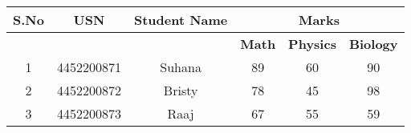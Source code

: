 \documentclass{article}
\begin{document}
\begin{tabular}{|c|c|c|c|c|c|}
\hline
\textbf{S.No} & \textbf{USN} & \textbf{Student Name} & \multicolumn{3}{c|}{\textbf{Marks}} \\ \hline
              &              &                       & \textbf{Math} & \textbf{Physics} & \textbf{Biology} \\ \hline
1             & 4452200871   & Suhana                & 89                & 60                & 90                \\ \hline
2             & 4452200872   & Bristy                & 78                & 45                & 98                \\ \hline
3             & 4452200873   & Raaj                  & 67                & 55                & 59                \\ \hline
\end{tabular}
\end{document}
